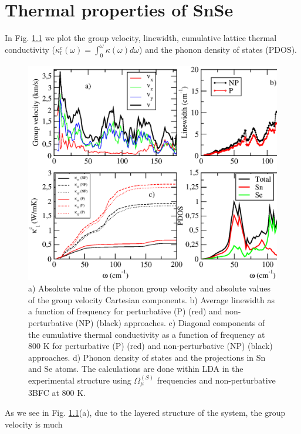 
\chapter{Thermal properties of SnSe} %

\label{thermal-properties} %

In Fig. \ref{thermal-analysis} we plot the group velocity, linewidth, cumulative lattice thermal conductivity
($\kappa_{l}^{c}(\omega)=\int_{0}^{\omega}\kappa(\omega)d\omega$) and the phonon density of states (PDOS).
\begin{figure}[th]
\includegraphics[width=\linewidth]{Figures/thermal_analysis.eps}
\caption[Thermal propertie of $Cmcm$ SnSe.]{a) Absolute value of the phonon group velocity and absolute values of the group velocity Cartesian 
components. b) Average linewidth as a function of frequency for perturbative (P) (red) and non-perturbative (NP) 
(black) approaches. c) Diagonal components of the cumulative thermal conductivity as a function of frequency at $800$ 
K for perturbative (P) (red) and non-perturbative (NP) (black) approaches. d) Phonon density of states and the 
projections in Sn and Se atoms. The calculations are done within LDA in the experimental structure using 
$\Omega^{(S)}_{\mu}$ frequencies and non-perturbative 3BFC at $800$ K.}
\label{thermal-analysis}
\end{figure}
As we see in Fig. \ref{thermal-analysis}(a), due to the layered structure of the system, the group velocity is much 
